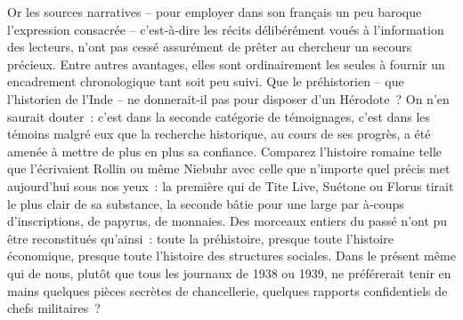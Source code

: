 \documentclass[french,twoside]{book} %
\newcommand{\astermono}{\medskip\centerline{\color{rubric}\large\selectfont{\syms ✻}}\medskip\par}%
\begin{document}
Or les sources narratives – pour employer dans son français un peu baroque l’expression consacrée – c’est‑à‑dire les récits délibérément voués à l’information des lecteurs, n’ont pas cessé assurément de prêter au chercheur un secours précieux. Entre autres avantages, elles sont ordi­nairement les seules à fournir un encadrement chronologique tant soit peu suivi. Que le préhistorien – que l’historien de l’Inde – ne donnerait‑il pas pour disposer d’un Hérodote ? On n’en saurait douter : c’est dans la seconde catégorie de témoignages, c’est dans les témoins malgré eux que la recherche historique, au cours de ses progrès, a été amenée à mettre de plus en plus sa confiance. Comparez l’histoire romaine telle que l’écri­vaient Rollin ou même Niebuhr avec celle que n’importe quel précis met aujourd’hui sous nos yeux : la première qui de Tite Live, Suétone ou Florus tirait le plus clair de sa substance, la seconde bâtie pour une large par à-coups d’inscriptions, de papyrus, de monnaies. Des morceaux entiers du passé n’ont pu être reconstitués qu’ainsi : toute la préhistoire, presque toute l’histoire économique, presque toute l’histoire des structures so­ciales. Dans le présent même qui de nous, plutôt que tous les journaux de 1938 ou 1939, ne préférerait tenir en mains quelques pièces secrètes de chancellerie, quelques rapports confidentiels de chefs militaires ?\par

\astermono
\end{document}
